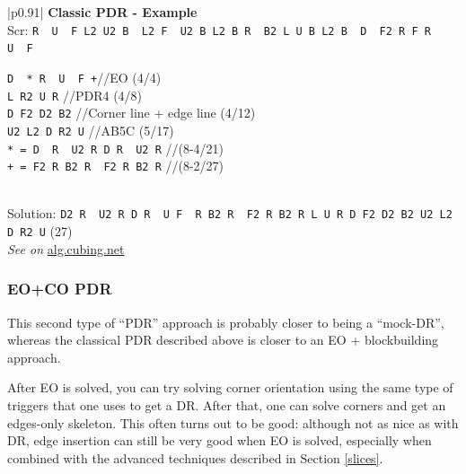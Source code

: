 \documentclass[11pt,a4paper]{book}
\newcommand{\p}{\textquotesingle}
\newcommand{\m}{\texttt}
\newcommand{\ps}{\p\,\,}
\newcommand{\comment}[1]{{\color{gray}\quad//#1}}
\begin{document}
\bigskip
\begin{tabular}{|p{}|}
\hline
\textbf{Classic PDR - Example}\\
\hline
Scr: \m{R\ps U\ps F L2 U2 B\ps L2 F\ps U2 B L2 B R\ps B2 L U B L2 B\ps D\ps F2 R F R\ps U\ps F}\\
\hline
\begin{minipage}[l]{0.650\textwidth}
\m{D\ps * R\ps U\ps F +}\comment{EO (4/4)}\\
\m{L R2 U R} \comment{PDR4 (4/8)}\\
\m{D F2 D2 B2} \comment{Corner line + edge line (4/12)}\\
\m{U2 L2 D R2 U} \comment{AB5C (5/17)}\\
\m{* = D\ps R\ps U2 R D R\ps U2 R} \comment{(8-4/21)}\\
\m{+ = F2 R B2 R\ps F2 R B2 R\p} \comment{(8-2/27)}
\end{minipage}
\begin{minipage}[c]{0.25\textwidth}

\end{minipage}\\
\hline
Solution: \m{D2 R\ps U2 R D R\ps U F\ps R B2 R\ps F2 R B2 R L U R D F2 D2 B2 U2 L2 D R2 U} (27)\\
\hline
\emph{See on }\href{https://alg.cubing.net/?setup=R-_U-_F_L2_U2_B-_L2_F-_U2_B_L2_B_R-_B2_L_U_B_L2_B-_D-_F2_R_F_R-_U-_F&alg=D-_R-_U-_F_\%2F\%2F_EO_FB\%0AL_R2_U_R_\%2F\%2F_PDR4\%0AD_F2_D2_B2_\%2F\%2F_CORNER_LINE\%26\%232b\%3B_EDGE_LINE\%0AU2_L2_D_R2_U_\%2F\%2F_AB5C_(17)}{alg.cubing.net}\\
\hline
\end{tabular}
\bigskip

\subsubsection{EO+CO PDR}

This second type of ``PDR'' approach is probably closer to being a ``mock-DR'', whereas the classical PDR described above is closer to an EO + blockbuilding approach.

After EO is solved, you can try solving corner orientation using the same type of triggers that one uses to get a DR. After that, one can solve corners and get an edges-only skeleton. This often turns out to be good: although not as nice as with DR, edge insertion can still be very good when EO is solved, especially when combined with the advanced techniques described in Section \ref{slices}.
\end{document}
